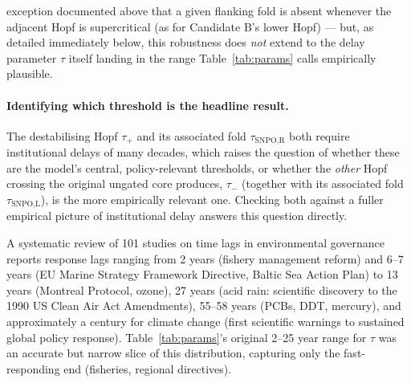 \documentclass[twocolumn,10pt]{article}
\begin{document}
exception documented above that a given flanking fold is absent whenever the adjacent Hopf is supercritical (as for Candidate B's lower Hopf) — but, as detailed immediately below, this robustness does \emph{not} extend to the delay parameter $\tau$ itself landing in the range Table~\ref{tab:params} calls empirically plausible.

\paragraph{Identifying which threshold is the headline result.} The destabilising Hopf $\tau_+$ and its associated fold $\tau_{\text{SNPO,R}}$ both require institutional delays of many decades, which raises the question of whether these are the model's central, policy-relevant thresholds, or whether the \emph{other} Hopf crossing the original ungated core produces, $\tau_-$ (together with its associated fold $\tau_{\text{SNPO,L}}$), is the more empirically relevant one. Checking both against a fuller empirical picture of institutional delay \cite{hocherman2025} answers this question directly.

A systematic review of 101 studies on time lags in environmental governance \cite{hocherman2025} reports response lags ranging from 2 years (fishery management reform) and 6--7 years (EU Marine Strategy Framework Directive, Baltic Sea Action Plan) to 13 years (Montreal Protocol, ozone), 27 years (acid rain: scientific discovery to the 1990 US Clean Air Act Amendments), 55--58 years (PCBs, DDT, mercury), and approximately a century for climate change (first scientific warnings to sustained global policy response). Table~\ref{tab:params}'s original 2--25 year range for $\tau$ was an accurate but narrow slice of this distribution, capturing only the fast-responding end (fisheries, regional directives).
\end{document}
